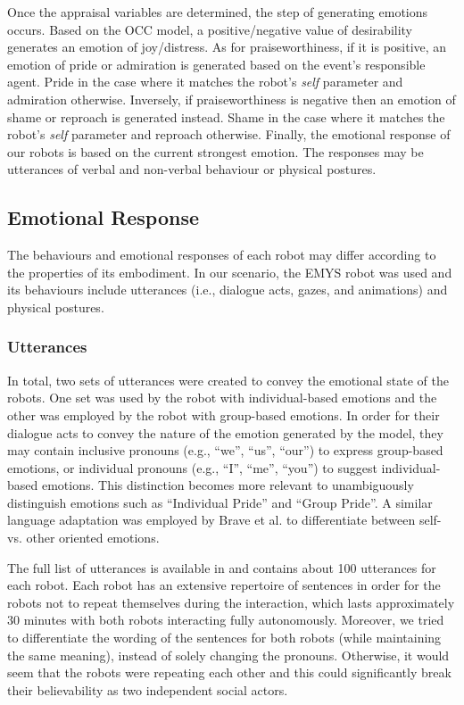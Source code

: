 Once the appraisal variables are determined, the step of generating emotions occurs. Based on the OCC model, a positive/negative value of desirability generates an emotion of joy/distress. As for praiseworthiness, if it is positive, an emotion of pride or admiration is generated based on the event's responsible agent. Pride in the case where it matches the robot's \textit{self} parameter and admiration otherwise. Inversely, if praiseworthiness is negative then an emotion of shame or reproach is generated instead. Shame in the case where it matches the robot's \textit{self} parameter and reproach otherwise. Finally, the emotional response of our robots is based on the current strongest emotion. The responses may be utterances of verbal and non-verbal behaviour or physical postures.




\subsection{Emotional Response}
The behaviours and emotional responses of each robot may differ according to the properties of its embodiment. In our scenario, the EMYS robot \cite{kkedzierski2013emys} was used and its behaviours include utterances (i.e., dialogue acts, gazes, and animations) and physical postures. 

\subsubsection{Utterances}
In total, two sets of utterances were created to convey the emotional state of the robots. One set was used by the robot with individual-based emotions and the other was employed by the robot with group-based emotions. In order for their dialogue acts to convey the nature of the emotion generated by the model, they may contain inclusive pronouns (e.g., ``we'', ``us'', ``our'') to express group-based emotions, or individual pronouns (e.g., ``I'', ``me'', ``you'') to suggest individual-based emotions. This distinction becomes more relevant to unambiguously distinguish emotions such as ``Individual Pride'' and ``Group Pride''. A similar language adaptation was employed by Brave et al. \cite{brave2005computers} to differentiate between self- vs. other oriented emotions.

The full list of utterances is available in \cite{correia2018} and contains about 100 utterances for each robot. Each robot has an extensive repertoire of sentences in order for the robots not to repeat themselves during the interaction, which lasts approximately 30 minutes with both robots interacting fully autonomously. Moreover, we tried to differentiate the wording of the sentences for both robots (while maintaining the same meaning), instead of solely changing the pronouns. Otherwise, it would seem that the robots were repeating each other and this could significantly break their believability as two independent social actors. 

